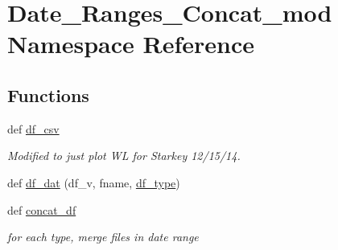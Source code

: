 \hypertarget{namespace_date___ranges___concat__mod}{}\section{Date\+\_\+\+Ranges\+\_\+\+Concat\+\_\+mod Namespace Reference}
\label{namespace_date___ranges___concat__mod}
\subsection*{Functions}
\begin{DoxyCompactItemize}
\item 
def \hyperlink{namespace_date___ranges___concat__mod_ac64bfb42b15ae8d092fce2d18e4f5468}{df\+\_\+csv}
\begin{DoxyCompactList}\small\item\em Modified to just plot W\+L for Starkey 12/15/14. \end{DoxyCompactList}\item 
def \hyperlink{namespace_date___ranges___concat__mod_aa09d91e8ea5223d589f885927577e318}{df\+\_\+dat} (df\+\_\+v, fname, \hyperlink{namespace_date___ranges___concat__mod_a9af9fbcb29f8cbf5b5bec5151e049dec}{df\+\_\+type})
\item 
def \hyperlink{namespace_date___ranges___concat__mod_abd1c96c609eee19a81e2c8b933d9a03a}{concat\+\_\+df}
\begin{DoxyCompactList}\small\item\em for each type, merge files in date range \end{DoxyCompactList}\end{DoxyCompactItemize}
